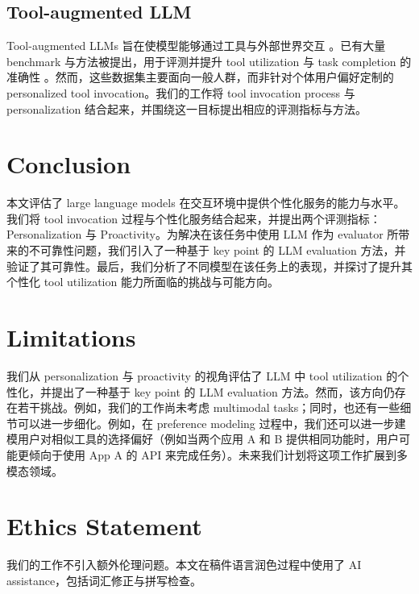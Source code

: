 \documentclass[11pt]{article}
\begin{document}
\subsection{Tool-augmented LLM}
Tool-augmented LLMs 旨在使模型能够通过工具与外部世界交互 \cite{10.1145/3704435, qu2025tool}。已有大量 benchmark 与方法被提出，用于评测并提升 tool utilization 与 task completion 的准确性 \cite{trivedi-etal-2024-appworld,li-etal-2023-api, hao2024citienhancingtoolutilizing, tang2023toolalpacageneralizedtoollearning, NEURIPS2023_9cb2a749}。然而，这些数据集主要面向一般人群，而非针对个体用户偏好定制的 personalized tool invocation。我们的工作将 tool invocation process 与 personalization 结合起来，并围绕这一目标提出相应的评测指标与方法。




\section{Conclusion}
本文评估了 large language models 在交互环境中提供个性化服务的能力与水平。我们将 tool invocation 过程与个性化服务结合起来，并提出两个评测指标：Personalization 与 Proactivity。为解决在该任务中使用 LLM 作为 evaluator 所带来的不可靠性问题，我们引入了一种基于 key point 的 LLM evaluation 方法，并验证了其可靠性。最后，我们分析了不同模型在该任务上的表现，并探讨了提升其个性化 tool utilization 能力所面临的挑战与可能方向。

\section*{Limitations}
我们从 personalization 与 proactivity 的视角评估了 LLM 中 tool utilization 的个性化，并提出了一种基于 key point 的 LLM evaluation 方法。然而，该方向仍存在若干挑战。例如，我们的工作尚未考虑 multimodal tasks；同时，也还有一些细节可以进一步细化。例如，在 preference modeling 过程中，我们还可以进一步建模用户对相似工具的选择偏好（例如当两个应用 A 和 B 提供相同功能时，用户可能更倾向于使用 App A 的 API 来完成任务）。未来我们计划将这项工作扩展到多模态领域。

\section*{Ethics Statement}
我们的工作不引入额外伦理问题。本文在稿件语言润色过程中使用了 AI assistance，包括词汇修正与拼写检查。


%

\newpage
\appendix
\end{document}
